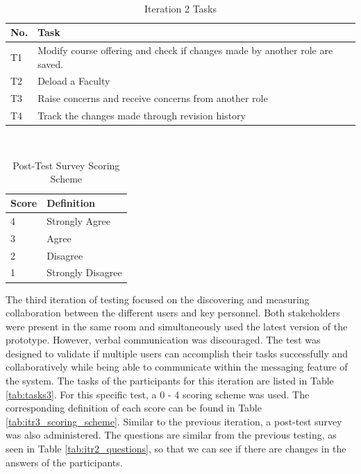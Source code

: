 \begin{table}
  \centering
  \caption{Iteration 2 Tasks}~\label{tab:tasks2}
  \addtolength{\tabcolsep}{2pt} 
  \begin{tabular}{p{0.5cm}|p{6.5cm}}
  	\toprule
    \rule{0pt}{8pt}No. & Task \\[2pt]
    \toprule
    T1 & Modify course offering and check if changes made by another role are saved. \\
    T2 & Deload a Faculty \\
    T3 & Raise concerns and receive concerns from another role \\
    T4 & Track the changes made through revision history \\
    \bottomrule
  \end{tabular}
  \addtolength{\tabcolsep}{-2pt} 
\end{table}

\begin{table}
  \centering
  \caption{Post-Test Survey Scoring Scheme}~\label{tab:scoring_scheme}
  \addtolength{\tabcolsep}{2pt} 
  \begin{tabular}{p{1cm}|p{5cm}}
  	\toprule
    \rule{0pt}{8pt}Score & Definition\\[2pt]
    \toprule
    4 & Strongly Agree \\
    3 & Agree \\
    2 & Disagree \\
    1 & Strongly Disagree \\
    \bottomrule
  \end{tabular}
  \addtolength{\tabcolsep}{-2pt} 
\end{table}
The third iteration of testing focused on the discovering and measuring collaboration between the different users and key personnel. Both stakeholders were present in the same room and simultaneously used the  latest version of the prototype. However, verbal communication was discouraged. The test was designed to validate if multiple users can accomplish their tasks successfully and collaboratively while being able to communicate within the messaging feature of the system. The tasks of the participants for this iteration are listed in Table \ref{tab:tasks3}. For this speciﬁc test, a 0 - 4 scoring scheme was used. The corresponding deﬁnition of each score can be found in Table \ref{tab:itr3_scoring_scheme}. Similar to the previous iteration, a post-test survey was also administered. The questions are similar from the previous testing, as seen in Table \ref{tab:itr2_questions}, so that we can see if there are changes in the answers of the participants. 

